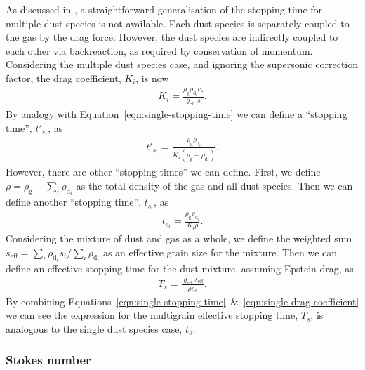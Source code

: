 \documentclass[fleqn,usenatbib]{mnras}
\newcommand{\g}{\mathrm{g}}
\newcommand{\dd}{\mathrm{d}}
\begin{document}
As discussed in \citet{Hutchison2018MNRAS.476.2186H}, a straightforward
generalisation of the stopping time for multiple dust species is not available.
Each dust species is separately coupled to the gas by the drag force. However,
the dust species are indirectly coupled to each other via backreaction, as
required by conservation of momentum. Considering the multiple dust species
case, and ignoring the supersonic correction factor, the drag coefficient,
\(K_i\), is now
%
\begin{align}
   \label{eqn:drag-coefficient}
   K_i = \frac{\rho_{\g} \rho_{\dd_i} c_s}{\varrho_{\mathrm{eff}} s_i}.
\end{align}
%
By analogy with Equation~\ref{eqn:single-stopping-time} we can define a
``stopping time'', \(t'_{s_i}\), as
%
\begin{align}
   \label{eqn:alternative-stopping-time}
   t'_{s_i} = \frac{\rho_{\g} \rho_{\dd_i}}{K_i (\rho_{\g} + \rho_{\dd_i})}.
\end{align}
%
However, there are other ``stopping times'' we can define. First, we define
\(\rho = \rho_{\g} + \sum_i \rho_{\dd_i}\) as the total density of the gas and
all dust species. Then we can define another ``stopping time'', \(t_{s_i}\), as
%
\begin{align}
   \label{eqn:stopping-time}
   t_{s_i} = \frac{\rho_{\g} \rho_{\dd_i}}{K_i \rho}.
\end{align}
%
Considering the mixture of dust and gas as a whole, we define the weighted sum
\(s_{\mathrm{eff}} = \sum_i \rho_{\dd_i} s_i / \sum_i \rho_{\dd_i}\) as an
effective grain size for the mixture. Then we can define an effective stopping
time for the dust mixture, assuming Epstein drag, as
%
\begin{align}
   \label{eqn:effective-stopping-time}
   T_s = \frac{\varrho_{\mathrm{eff}} s_{\mathrm{eff}}}{\rho c_s}.
\end{align}
%
By combining
Equations~\ref{eqn:single-stopping-time}~\&~\ref{eqn:single-drag-coefficient} we
can see the expression for the multigrain effective stopping time, \(T_s\), is
analogous to the single dust species case, \(t_s\).

\subsubsection{Stokes number}
\end{document}
